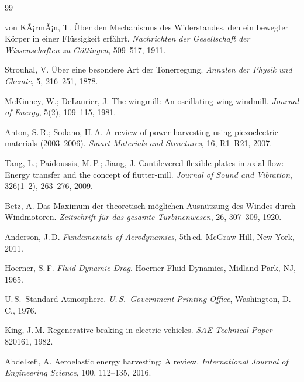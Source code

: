 ﻿\documentclass[12pt, a4paper]{report}
\theoremstyle{definition}
\theoremstyle{remark}
\begin{document}
\begin{thebibliography}{99}

  von KÃ¡rmÃ¡n, T.
  Über den Mechanismus des Widerstandes, den ein bewegter Körper in einer
  Flüssigkeit erfährt.
  \textit{Nachrichten der Gesellschaft der Wissenschaften zu Göttingen}, 509--517, 1911.

  Strouhal, V.
  Über eine besondere Art der Tonerregung.
  \textit{Annalen der Physik und Chemie}, 5, 216--251, 1878.

  McKinney, W.; DeLaurier, J.
  The wingmill: An oscillating-wing windmill.
  \textit{Journal of Energy}, 5(2), 109--115, 1981.

  Anton, S.\,R.; Sodano, H.\,A.
  A review of power harvesting using piezoelectric materials (2003--2006).
  \textit{Smart Materials and Structures}, 16, R1--R21, 2007.

  Tang, L.; Paidoussis, M.\,P.; Jiang, J.
  Cantilevered flexible plates in axial flow: Energy transfer and the
  concept of flutter-mill.
  \textit{Journal of Sound and Vibration}, 326(1--2), 263--276, 2009.

  Betz, A.
  Das Maximum der theoretisch möglichen Ausnützung des Windes durch Windmotoren.
  \textit{Zeitschrift für das gesamte Turbinenwesen}, 26, 307--309, 1920.

  Anderson, J.\,D.
  \textit{Fundamentals of Aerodynamics}, 5th\,ed.
  McGraw-Hill, New York, 2011.

  Hoerner, S.\,F.
  \textit{Fluid-Dynamic Drag}.
  Hoerner Fluid Dynamics, Midland Park, NJ, 1965.

  U.\,S.\ Standard Atmosphere.
  \textit{U.\,S.\ Government Printing Office}, Washington, D.\,C., 1976.

  King, J.\,M.
  Regenerative braking in electric vehicles.
  \textit{SAE Technical Paper} 820161, 1982.

  Abdelkefi, A.
  Aeroelastic energy harvesting: A review.
  \textit{International Journal of Engineering Science}, 100, 112--135, 2016.


\end{thebibliography}
\end{document}
